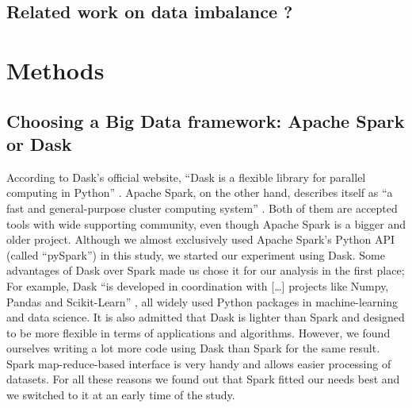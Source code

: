 \documentclass[conference]{IEEEtran}
\begin{document}
\subsection{Related work on data imbalance ?}

\section{Methods}
\subsection{Choosing a Big Data framework: Apache Spark or Dask}
According to Dask’s official website, “Dask is a flexible library for parallel computing in Python” \cite{dask}. Apache Spark, on the other hand, describes itself as “a fast and general-purpose cluster computing system” \cite{spark}. Both of them are accepted tools with wide supporting community, even though Apache Spark is a bigger and older project. Although we almost exclusively used Apache Spark’s Python API (called “pySpark”) in this study, we started our experiment using Dask. Some advantages of Dask over Spark made us chose it for our analysis in the first place; For example, Dask “is developed in coordination with […] projects like Numpy, Pandas and Scikit-Learn” \cite{dask}, all widely used Python packages in machine-learning and data science. It is also admitted that Dask is lighter than Spark and designed to be more flexible in terms of applications and algorithms. However, we found ourselves writing a lot more code using Dask than Spark for the same result. Spark map-reduce-based interface is very handy and allows easier processing of datasets. For all these reasons we found out that Spark fitted our needs best and we switched to it at an early time of the study.
\end{document}
